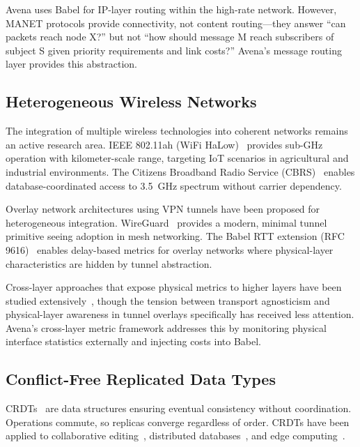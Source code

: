 \documentclass[journal]{IEEEtran}
\begin{document}
Avena uses Babel for IP-layer routing within the high-rate network. However, MANET protocols provide connectivity, not content routing---they answer ``can packets reach node X?'' but not ``how should message M reach subscribers of subject S given priority requirements and link costs?'' Avena's message routing layer provides this abstraction.

\subsection{Heterogeneous Wireless Networks}

The integration of multiple wireless technologies into coherent networks remains an active research area. IEEE 802.11ah (WiFi HaLow)~\cite{sun2013halow} provides sub-GHz operation with kilometer-scale range, targeting IoT scenarios in agricultural and industrial environments. The Citizens Broadband Radio Service (CBRS)~\cite{fcc2015cbrs} enables database-coordinated access to 3.5~GHz spectrum without carrier dependency.

Overlay network architectures using VPN tunnels have been proposed for heterogeneous integration. WireGuard~\cite{donenfeld2017wireguard} provides a modern, minimal tunnel primitive seeing adoption in mesh networking. The Babel RTT extension (RFC 9616)~\cite{jonglez2024rtt} enables delay-based metrics for overlay networks where physical-layer characteristics are hidden by tunnel abstraction.

Cross-layer approaches that expose physical metrics to higher layers have been studied extensively~\cite{srivastava2005crosslayer}, though the tension between transport agnosticism and physical-layer awareness in tunnel overlays specifically has received less attention. Avena's cross-layer metric framework addresses this by monitoring physical interface statistics externally and injecting costs into Babel.

\subsection{Conflict-Free Replicated Data Types}

CRDTs~\cite{shapiro2011crdts} are data structures ensuring eventual consistency without coordination. Operations commute, so replicas converge regardless of order. CRDTs have been applied to collaborative editing~\cite{attiya2016crdt}, distributed databases~\cite{bailis2013bolt}, and edge computing~\cite{vanderlinde2017practical}.
\end{document}
